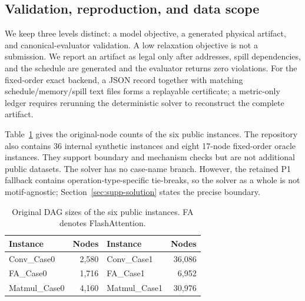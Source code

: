 \subsection{Validation, reproduction, and data scope}

We keep three levels distinct: a model objective, a generated physical artifact, and canonical-evaluator validation. A low relaxation objective is not a submission. We report an artifact as legal only after addresses, spill dependencies, and the schedule are generated and the evaluator returns zero violations. For the fixed-order exact backend, a JSON record together with matching schedule/memory/spill text files forms a replayable certificate; a metric-only ledger requires rerunning the deterministic solver to reconstruct the complete artifact.

Table~\ref{tab:supp-public-size} gives the original-node counts of the six public instances. The repository also contains 36 internal synthetic instances and eight 17-node fixed-order oracle instances. They support boundary and mechanism checks but are not additional public datasets. The solver has no case-name branch. However, the retained P1 fallback contains operation-type-specific tie-breaks, so the solver as a whole is not motif-agnostic; Section~\ref{sec:supp-solution} states the precise boundary.

\begin{table}[H]
\centering
\caption{Original DAG sizes of the six public instances. FA denotes FlashAttention.}
\label{tab:supp-public-size}
\begin{tabular}{@{}lrlr@{}}
\toprule
Instance & Nodes & Instance & Nodes\\
\midrule
Conv\_Case0 & 2,580 & Conv\_Case1 & 36,086\\
FA\_Case0 & 1,716 & FA\_Case1 & 6,952\\
Matmul\_Case0 & 4,160 & Matmul\_Case1 & 30,976\\
\bottomrule
\end{tabular}
\end{table}
